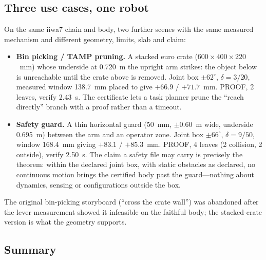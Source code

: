 \documentclass[10pt,twocolumn,letterpaper]{article}
\begin{document}
\subsection{Three use cases, one robot}\label{sec:usecases}
On the same iiwa7 chain and body, two further scenes with the same measured mechanism and different geometry, limits, slab and claim:
\begin{itemize}
\item \textbf{Bin picking / TAMP pruning.} A stacked euro crate ($600\times400\times220$~mm) whose underside at 0.720~m the upright arm strikes: the object below is unreachable until the crate above is removed. Joint box $\pm62^\circ$, $\delta=3/20$, measured window 138.7~mm placed to give $+66.9$ / $+71.7$~mm. PROOF, 2 leaves, verify 2.43~s. The certificate lets a task planner prune the ``reach directly'' branch with a proof rather than a timeout.
\item \textbf{Safety guard.} A thin horizontal guard (50~mm, $\pm0.60$~m wide, underside 0.695~m) between the arm and an operator zone. Joint box $\pm66^\circ$, $\delta=9/50$, window 168.4~mm giving $+83.1$ / $+85.3$~mm. PROOF, 4 leaves (2 collision, 2 outside), verify 2.50~s. The claim a safety file may carry is precisely the theorem: within the declared joint box, with static obstacles as declared, no continuous motion brings the certified body past the guard---nothing about dynamics, sensing or configurations outside the box.
\end{itemize}
The original bin-picking storyboard (``cross the crate wall'') was abandoned after the lever measurement showed it infeasible on the faithful body; the stacked-crate version is what the geometry supports.

\subsection{Summary}
\end{document}
